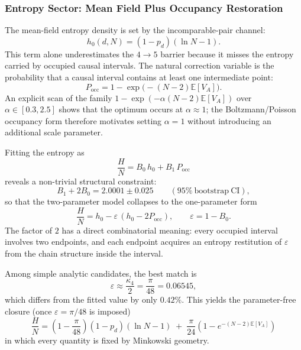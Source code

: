 \documentclass[12pt,a4paper]{article}
\begin{document}
\subsubsection{Entropy Sector: Mean Field Plus Occupancy Restoration}
\label{sec:root_cause}

The mean-field entropy density is set by the incomparable-pair channel:
\begin{equation}
h_0(d,N) = (1-p_d)(\ln N - 1).
\end{equation}
This term alone underestimates the $4{\to}5$ barrier because it misses the
entropy carried by occupied causal intervals. The natural correction variable is
the probability that a causal interval contains at least one intermediate point:
\begin{equation}
P_{\mathrm{occ}} = 1 - \exp\!\bigl(-(N-2)\mathbb{E}[V_A]\bigr).
\label{eq:pocc}
\end{equation}
An explicit scan of the family $1-\exp(-\alpha (N-2)\mathbb{E}[V_A])$ over
$\alpha \in [0.3,2.5]$ shows that the optimum occurs at $\alpha \approx 1$;
the Boltzmann/Poisson occupancy form therefore motivates setting $\alpha = 1$
without introducing an additional scale parameter.

Fitting the entropy as
\begin{equation}
\frac{H}{N} = B_0\,h_0 + B_1\,P_{\mathrm{occ}}
\end{equation}
reveals a non-trivial structural constraint:
\begin{equation}
B_1 + 2B_0 = 2.0001 \pm 0.025 \qquad (95\%~\mathrm{bootstrap~CI}),
\end{equation}
so that the two-parameter model collapses to the one-parameter form
\begin{equation}
\frac{H}{N}
=
h_0 - \varepsilon\,(h_0 - 2P_{\mathrm{occ}}),
\qquad
\varepsilon = 1-B_0.
\label{eq:entropy_transfer}
\end{equation}
The factor of $2$ has a direct combinatorial meaning: every occupied interval
involves two endpoints, and each endpoint acquires an entropy restitution of
$\varepsilon$ from the chain structure inside the interval.

Among simple analytic candidates, the best match is
\begin{equation}
\varepsilon \approx \frac{\kappa_4}{2} = \frac{\pi}{48} = 0.06545,
\end{equation}
which differs from the fitted value by only $0.42\%$.
This yields the parameter-free closure (once $\varepsilon = \pi/48$ is imposed)
\begin{equation}
\boxed{
\frac{H}{N}
=
\left(1-\frac{\pi}{48}\right)(1-p_d)(\ln N - 1)
\;+\;
\frac{\pi}{24}\left(1-e^{-(N-2)\mathbb{E}[V_A]}\right)
}
\label{eq:entropy_zero_param}
\end{equation}
in which every quantity is fixed by Minkowski geometry.
\end{document}

